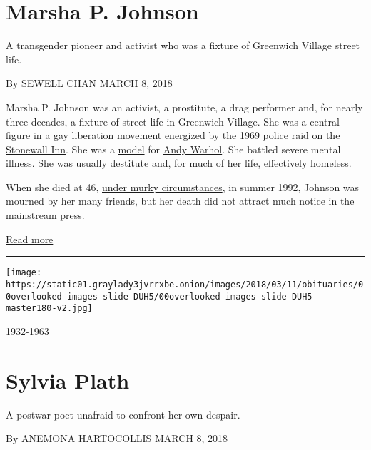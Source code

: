 \hypertarget{marsha-p-johnson}{%
\section{Marsha P. Johnson}\label{marsha-p-johnson}}

A transgender pioneer and activist who was a fixture of Greenwich
Village street life.

By SEWELL CHAN MARCH 8, 2018

Marsha P. Johnson was an activist, a prostitute, a drag performer and,
for nearly three decades, a fixture of street life in Greenwich Village.
She was a central figure in a gay liberation movement energized by the
1969 police raid on the
\href{https://www.nytimes3xbfgragh.onion/2016/06/25/nyregion/stonewall-inn-named-national-monument-a-first-for-gay-rights-movement.html}{Stonewall
Inn}. She was a
\href{https://onlineonly.christies.com/s/andy-warhol-christies-andys-eye-candy/ladies-gentlemen-marsha-johnson-98/6817}{model}
for
\href{http://www.nytimes3xbfgragh.onion/1987/02/23/obituaries/andy-warhol-pop-artist-dies.html}{Andy
Warhol}. She battled severe mental illness. She was usually destitute
and, for much of her life, effectively homeless.

When she died at 46,
\href{https://www.nytimes3xbfgragh.onion/2017/10/05/movies/the-death-and-life-of-marsha-p-johnson-review.html}{under
murky circumstances}, in summer 1992, Johnson was mourned by her many
friends, but her death did not attract much notice in the mainstream
press.

\href{https://www.nytimes3xbfgragh.onion/interactive/2018/obituaries/overlooked-marsha-p-johnson.html}{Read
more}

\begin{center}\rule{0.5\linewidth}{\linethickness}\end{center}

\texttt{[image: https://static01.graylady3jvrrxbe.onion/images/2018/03/11/obituaries/00overlooked-images-slide-DUH5/00overlooked-images-slide-DUH5-master180-v2.jpg]}

1932-1963

\hypertarget{sylvia-plath}{%
\section{Sylvia Plath}\label{sylvia-plath}}

A postwar poet unafraid to confront her own despair.

By ANEMONA HARTOCOLLIS MARCH 8, 2018

